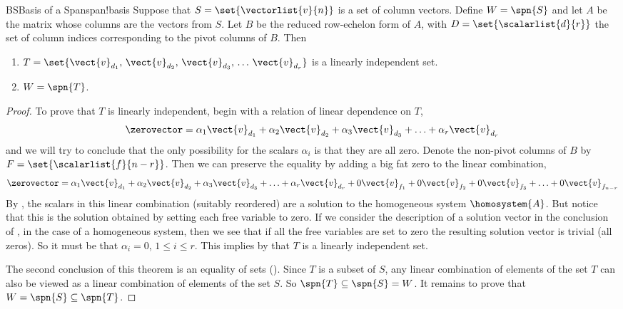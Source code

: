 %
\begin{theorem}{BS}{Basis of a Span}{span!basis}
Suppose that $S=\set{\vectorlist{v}{n}}$ is a set of column vectors.  Define $W=\spn{S}$ and let $A$ be the matrix whose columns are the vectors from $S$.  Let $B$ be the reduced row-echelon form of $A$, with $D=\set{\scalarlist{d}{r}}$ the set of column indices corresponding to the pivot columns of $B$.  Then
\begin{enumerate}
\item $T=\set{\vect{v}_{d_1},\,\vect{v}_{d_2},\,\vect{v}_{d_3},\,\ldots\,\vect{v}_{d_r}}$ is a linearly independent set.
\item $W=\spn{T}$.
\end{enumerate}
\end{theorem}
%
\begin{proof}
To prove that $T$ is linearly independent, begin with a relation of linear dependence on $T$,
%
\begin{equation*}
\zerovector=
\alpha_1\vect{v}_{d_1}+\alpha_2\vect{v}_{d_2}+\alpha_3\vect{v}_{d_3}+\ldots+\alpha_r\vect{v}_{d_r}
\end{equation*}
and we will try to conclude that the only possibility for the scalars $\alpha_i$ is that they are all zero.
Denote the non-pivot columns of $B$ by $F=\set{\scalarlist{f}{n-r}}$.  Then we can preserve the equality by adding a big fat zero to the linear combination,
%
\begin{equation*}
\zerovector=
\alpha_1\vect{v}_{d_1}+\alpha_2\vect{v}_{d_2}+\alpha_3\vect{v}_{d_3}+\ldots+\alpha_r\vect{v}_{d_r}+
0\vect{v}_{f_1}+0\vect{v}_{f_2}+0\vect{v}_{f_3}+\ldots+0\vect{v}_{f_{n-r}}
\end{equation*}
%
By , the scalars in this linear combination (suitably reordered) are a solution to the homogeneous system $\homosystem{A}$.  But notice that this is the solution obtained by setting each free variable to zero.   If we consider the description of a solution vector in the conclusion of , in the case of a homogeneous system, then we see that if all the free variables are set to zero the resulting solution vector is trivial (all zeros).   So it must be that $\alpha_i=0$, $1\leq i\leq r$.  This implies by  that $T$ is a linearly independent set.\par
%
The second conclusion of this theorem is an equality of sets ().  Since $T$ is a subset of $S$, any linear combination of elements of the set $T$ can also be viewed as a linear combination of elements of the set $S$.  So $\spn{T}\subseteq\spn{S}=W$.  It remains to prove that $W=\spn{S}\subseteq\spn{T}$.\par

\end{proof}
